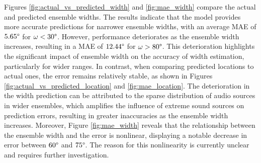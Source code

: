\documentclass{article}
\begin{document}
Figures \ref{fig:actual_vs_predicted_width} and \ref{fig:mae_width} compare the actual and predicted ensemble widths. The results indicate that the model provides more accurate predictions for narrower ensemble widths, with an average MAE of $5.65\degree$ for $\omega < 30\degree$. However, performance deteriorates as the ensemble width increases, resulting in a MAE of $12.44\degree$ for $\omega > 80\degree$. This deterioration highlights the significant impact of ensemble width on the accuracy of width estimation, particularly for wider ranges. In contrast, when comparing predicted locations to actual ones, the error remains relatively stable, as shown in Figures \ref{fig:actual_vs_predicted_location} and \ref{fig:mae_location}. The  deterioration in the width prediction can be attributed to the sparse distribution of audio sources in wider ensembles, which amplifies the influence of extreme sound sources on prediction errors, resulting in greater inaccuracies as the ensemble width increases. Moreover, Figure \ref{fig:mae_width} reveals that the relationship between the ensemble width and the error is nonlinear, displaying a notable decrease in error between $60\degree$ and $75\degree$. The reason for this nonlinearity is currently unclear and requires further investigation.

\end{document}
